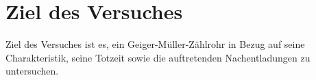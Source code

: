\section{Ziel des Versuches}
\label{sec:versuchsziel}

Ziel des Versuches ist es, ein Geiger-Müller-Zählrohr
in Bezug auf seine Charakteristik, seine 
Totzeit sowie die auftretenden Nachentladungen
zu untersuchen.